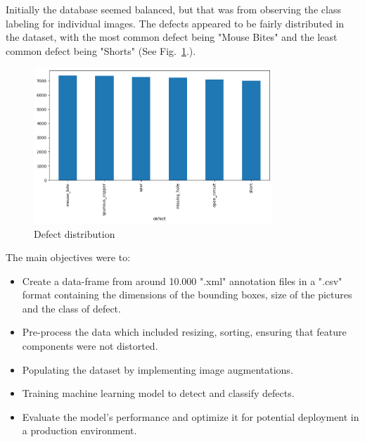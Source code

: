 \documentclass[12pt]{article}
\begin{document}
Initially the database seemed balanced, but that was from observing the class labeling for individual images. The defects appeared to be fairly distributed in the dataset, with the most common defect being "Mouse Bites" and the least common defect being "Shorts" (See Fig.~\ref{fig:defect_dist}.).

\begin{figure}[h]
    \centering
    \includegraphics[width=0.8\textwidth]{./graphics/1.png}
    \caption{Defect distribution}
    \label{fig:defect_dist}
\end{figure}
The main objectives were to:
\begin{itemize}
    \item Create a data-frame from around 10.000 ".xml" annotation files in a ".csv" format containing the dimensions of the bounding boxes, size of the pictures and the class of defect.
    \item Pre-process the data which included resizing, sorting, ensuring that feature components were not distorted. 
    \item Populating the dataset by implementing image augmentations.
    \item Training machine learning model to detect and classify defects.
    \item Evaluate the model's performance and optimize it for potential deployment in a production environment.
\end{itemize}
\end{document}
